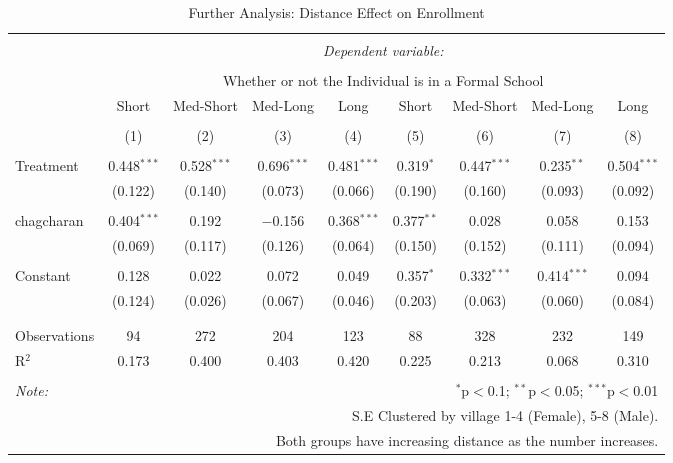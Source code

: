 \documentclass[
]{article}
\begin{document}
\begin{table}[!htbp] \centering 
  \caption{Further Analysis: Distance Effect on Enrollment} 
  \label{} 
\begin{tabular}{@{\extracolsep{-10pt}}lcccccccc} 
\\[-1.8ex]\hline 
\hline \\[-1.8ex] 
 & \multicolumn{8}{c}{\textit{Dependent variable:}} \\ 
\cline{2-9} 
\\[-1.8ex] & \multicolumn{8}{c}{Whether or not the Individual is in a Formal School} \\ 
 & Short & Med-Short & Med-Long & Long & Short & Med-Short & Med-Long & Long \\ 
\\[-1.8ex] & (1) & (2) & (3) & (4) & (5) & (6) & (7) & (8)\\ 
\hline \\[-1.8ex] 
 Treatment & 0.448$^{***}$ & 0.528$^{***}$ & 0.696$^{***}$ & 0.481$^{***}$ & 0.319$^{*}$ & 0.447$^{***}$ & 0.235$^{**}$ & 0.504$^{***}$ \\ 
  & (0.122) & (0.140) & (0.073) & (0.066) & (0.190) & (0.160) & (0.093) & (0.092) \\ 
  & & & & & & & & \\ 
 chagcharan & 0.404$^{***}$ & 0.192 & $-$0.156 & 0.368$^{***}$ & 0.377$^{**}$ & 0.028 & 0.058 & 0.153 \\ 
  & (0.069) & (0.117) & (0.126) & (0.064) & (0.150) & (0.152) & (0.111) & (0.094) \\ 
  & & & & & & & & \\ 
 Constant & 0.128 & 0.022 & 0.072 & 0.049 & 0.357$^{*}$ & 0.332$^{***}$ & 0.414$^{***}$ & 0.094 \\ 
  & (0.124) & (0.026) & (0.067) & (0.046) & (0.203) & (0.063) & (0.060) & (0.084) \\ 
  & & & & & & & & \\ 
\hline \\[-1.8ex] 
Observations & 94 & 272 & 204 & 123 & 88 & 328 & 232 & 149 \\ 
R$^{2}$ & 0.173 & 0.400 & 0.403 & 0.420 & 0.225 & 0.213 & 0.068 & 0.310 \\ 
\hline 
\hline \\[-1.8ex] 
\textit{Note:}  & \multicolumn{8}{r}{$^{*}$p$<$0.1; $^{**}$p$<$0.05; $^{***}$p$<$0.01} \\ 
 & \multicolumn{8}{r}{S.E Clustered by village 1-4 (Female), 5-8 (Male).} \\ 
 & \multicolumn{8}{r}{Both groups have increasing distance as the number increases.} \\ 
\end{tabular} 
\end{table}
\end{document}

